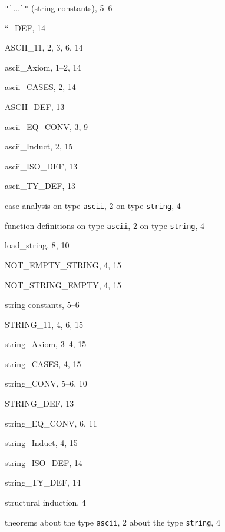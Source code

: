 \begin{theindex}

  \item \verb+"`+$\dots$\verb+`"+ (string constants), 5--6
  \item {\ptt ``\_DEF}, 14

  \indexspace

  \item {\ptt ASCII\_11}, 2, 3, 6, 14
  \item {\ptt ascii\_Axiom}, 1--2, 14
  \item {\ptt ascii\_CASES}, 2, 14
  \item {\ptt ASCII\_DEF}, 13
  \item {\ptt ascii\_EQ\_CONV}, 3, 9
  \item {\ptt ascii\_Induct}, 2, 15
  \item {\ptt ascii\_ISO\_DEF}, 13
  \item {\ptt ascii\_TY\_DEF}, 13

  \indexspace

  \item case analysis
    \subitem on type {\tt ascii}, 2
    \subitem on type {\tt string}, 4

  \indexspace

  \item function definitions
    \subitem on type {\tt ascii}, 2
    \subitem on type {\tt string}, 4

  \indexspace

  \item {\ptt load\_string}, 8, 10

  \indexspace

  \item {\ptt NOT\_EMPTY\_STRING}, 4, 15
  \item {\ptt NOT\_STRING\_EMPTY}, 4, 15

  \indexspace

  \item string constants, 5--6
  \item {\ptt STRING\_11}, 4, 6, 15
  \item {\ptt string\_Axiom}, 3--4, 15
  \item {\ptt string\_CASES}, 4, 15
  \item {\ptt string\_CONV}, 5--6, 10
  \item {\ptt STRING\_DEF}, 13
  \item {\ptt string\_EQ\_CONV}, 6, 11
  \item {\ptt string\_Induct}, 4, 15
  \item {\ptt string\_ISO\_DEF}, 14
  \item {\ptt string\_TY\_DEF}, 14
  \item structural induction, 4

  \indexspace

  \item theorems
    \subitem about the type {\tt ascii}, 2
    \subitem about the type {\tt string}, 4

\end{theindex}
